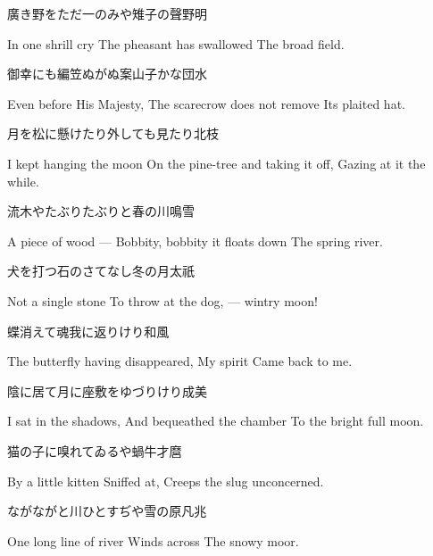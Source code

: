\begin{haiku}
    {\FH 廣き野をただ一のみや雉子の聲}\hfill{\FH 野明}

    \vin{} In one shrill cry
    \vin{} \vin{} The pheasant has swallowed
    \vin{} \vin{} \vin{} The broad field.
\end{haiku}

\begin{haiku}
    {\FH 御幸にも編笠ぬがぬ案山子かな}\hfill{\FH 団水}

    \vin{} Even before His Majesty,
    \vin{} \vin{} The scarecrow does not remove
    \vin{} \vin{} \vin{} Its plaited hat.
\end{haiku}

\begin{haiku}
    {\FH 月を松に懸けたり外しても見たり}\hfill{\FH 北枝}

    \vin{} I kept hanging the moon
    \vin{} \vin{} On the pine-tree and taking it off,
    \vin{} \vin{} \vin{} Gazing at it the while.
\end{haiku}

\begin{haiku}
    {\FH 流木やたぶりたぶりと春の川}\hfill{\FH 鳴雪}

    \vin{} A piece of wood ---
    \vin{} \vin{} Bobbity, bobbity it floats down
    \vin{} \vin{} \vin{} The spring river.
\end{haiku}

\begin{haiku}
    {\FH 犬を打つ石のさてなし冬の月}\hfill{\FH 太祇}

    \vin{} Not a single stone
    \vin{} \vin{} To throw at the dog, ---
    \vin{} \vin{} \vin{} wintry moon!
\end{haiku}

\begin{haiku}
    {\FH 蝶消えて魂我に返りけり}\hfill{\FH 和風}

    \vin{} The butterfly having disappeared,
    \vin{} \vin{} My spirit
    \vin{} \vin{} \vin{} Came back to me.
\end{haiku}

\begin{haiku}
    {\FH 陰に居て月に座敷をゆづりけり}\hfill{\FH 成美}

    \vin{} I sat in the shadows,
    \vin{} \vin{} And bequeathed the chamber
    \vin{} \vin{} \vin{} To the bright full moon.
\end{haiku}

\begin{haiku}
    {\FH 猫の子に嗅れてゐるや蝸牛}\hfill{\FH 才麿}

    \vin{} By a little kitten
    \vin{} \vin{} Sniffed at,
    \vin{} \vin{} \vin{} Creeps the slug unconcerned.
\end{haiku}

\begin{haiku}
    {\FH ながながと川ひとすぢや雪の原}\hfill{\FH 凡兆}

    \vin{} One long line of river
    \vin{} \vin{} Winds across
    \vin{} \vin{} \vin{} The snowy moor.
\end{haiku}
